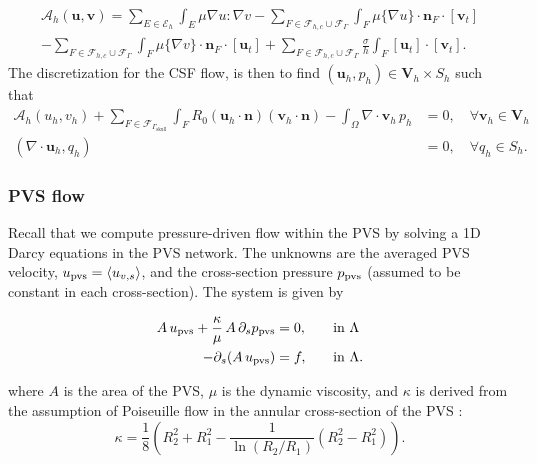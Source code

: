 \documentclass[fleqn,10pt]{wlscirep}
\begin{document}
\begin{multline}
\mathcal{A}_h (\bm u, \bm v) = \sum_{E \in \mathcal{E}_h} \int_{E} \mu \nabla u : \nabla v - \sum_{
F \in \mathcal{F}_{h,c} \cup \mathcal{F}_{\Gamma} 
} \int_{F} \mu \{\nabla u\}\cdot \bm n_F \cdot [\bm v_t] 
\\ - \sum_{
F \in \mathcal{F}_{h,c} \cup \mathcal{F}_{\Gamma} 
} \int_{F} \mu \{\nabla v\}\cdot \bm n_F \cdot [\bm u_t]
+ \sum_{
F \in \mathcal{F}_{h,c} \cup \mathcal{F}_{\Gamma} 
} \frac{\sigma}{h} \int_{F} [\bm u_t ] \cdot [\bm v_t].   
\end{multline}
The discretization for the CSF flow, is then to find $(\bm u_h, p_h) \in \bm V_h \times S_h$ such  that 
\begin{align}
\mathcal{A}_h(u_h, v_h)  + \sum_{F \in \mathcal{F}_{\Gamma_{\mathrm{skull}}}} \int_{F} R_0 (\bm u_h \cdot \bm n) (\bm v_h \cdot \bm n) - \int_{\Omega} \nabla \cdot \bm v_h \, p_h  & = 0, \quad \forall \bm v_h \in \bm V_h   \\ 
(\nabla \cdot \bm u_h , q_h ) & = 0, \quad \forall q_h \in S_h.
\end{align}
\subsubsection{PVS flow} 


Recall that we compute pressure-driven flow within the PVS by solving a 1D Darcy equations in the PVS network. The unknowns are the averaged PVS velocity, $u_{\rm pvs} = \langle u_{v,s} \rangle$, and the cross-section pressure $p_{\rm pvs} $ (assumed to be constant in each cross-section). The system is given by  \cite{daversin2022geometrically, 
gjerde2024directional} 

\begin{alignat}{2}
A \,  u_{\rm pvs}   + \frac{\kappa}{\mu} \, A \, \partial_{s} p_{\rm pvs} & = 0, &&  \quad \rm in  \,\, \Lambda  \\ 
-\partial_s (A \, u_{\rm pvs}) & = f, && \quad \rm in  \,\, \Lambda .  
\end{alignat} 

where $A$ is the area of the PVS, $\mu$ is the dynamic viscosity, and $\kappa$ is derived from the assumption of Poiseuille flow in the annular cross-section of the PVS  \cite{daversin2022geometrically,tithof2022network}: 
\begin{equation}
\kappa = \frac18 \left( R_2^2 + R_1^2 - \frac{1}{\ln(R_2/R_1)} (R_2^2- R_1^2) \right). 
\end{equation}
\end{document}
